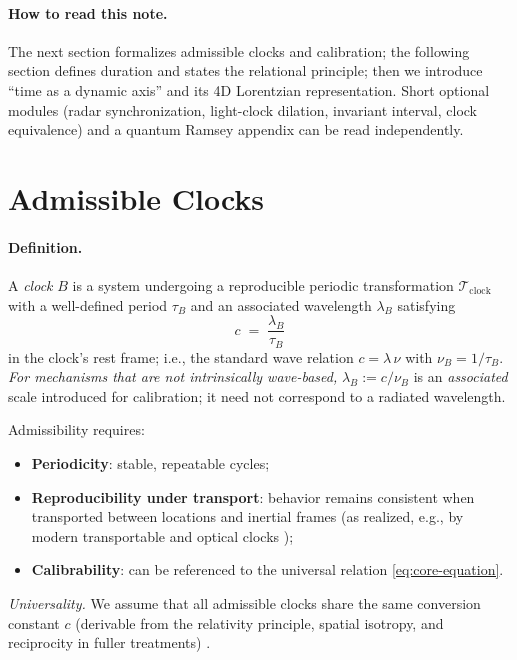 \documentclass[12pt]{article}
\begin{document}
\paragraph{How to read this note.}
The next section formalizes admissible clocks and calibration; the following section defines duration and states the relational principle; then we introduce “time as a dynamic axis” and its 4D Lorentzian representation. Short optional modules (radar synchronization, light-clock dilation, invariant interval, clock equivalence) and a quantum Ramsey appendix can be read independently.

\section{Admissible Clocks}

\paragraph{Definition.}
A \emph{clock} \(B\) is a system undergoing a reproducible periodic transformation
\(\mathcal{T}_{\mathrm{clock}}\) with a well-defined period \(\tau_B\) and an associated
wavelength \(\lambda_B\) satisfying
\begin{equation}
  c \;=\; \frac{\lambda_B}{\tau_B}
  \label{eq:core-equation}
\end{equation}
in the clock’s rest frame; i.e., the standard wave relation \(c=\lambda\,\nu\) with
\(\nu_B=1/\tau_B\).
\emph{For mechanisms that are not intrinsically wave-based,} \(\lambda_B:=c/\nu_B\) is an
\emph{associated} scale introduced for calibration; it need not correspond to a radiated wavelength.

\medskip
\noindent
Admissibility requires:
\begin{itemize}
    \item[(i)] \textbf{Periodicity}: stable, repeatable cycles;
    \item[(ii)] \textbf{Reproducibility under transport}: behavior remains consistent when transported between locations and inertial frames (as realized, e.g., by modern transportable and optical clocks \cite{Chou2010});
    \item[(iii)] \textbf{Calibrability}: can be referenced to the universal relation \eqref{eq:core-equation}.
\end{itemize}

\noindent\emph{Universality.} We assume that all admissible clocks share the same conversion constant \(c\) (derivable from the relativity principle, spatial isotropy, and reciprocity in fuller treatments) \cite{BerziGorini1969,LevyLeblond1976,Mermin1984}.
\end{document}
